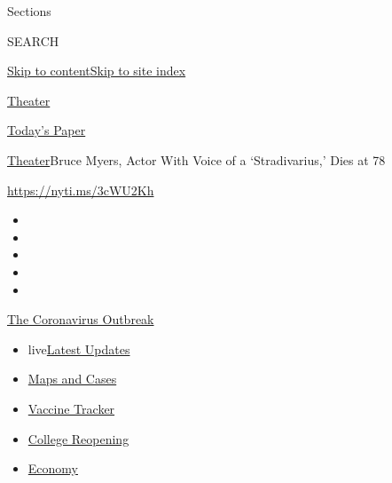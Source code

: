 Sections

SEARCH

\protect\hyperlink{site-content}{Skip to
content}\protect\hyperlink{site-index}{Skip to site index}

\href{https://www.nytimes.com/section/theater}{Theater}

\href{https://myaccount.nytimes.com/auth/login?response_type=cookie\&client_id=vi}{}

\href{https://www.nytimes.com/section/todayspaper}{Today's Paper}

\href{/section/theater}{Theater}\textbar{}Bruce Myers, Actor With Voice
of a `Stradivarius,' Dies at 78

\url{https://nyti.ms/3cWU2Kh}

\begin{itemize}
\item
\item
\item
\item
\item
\end{itemize}

\href{https://www.nytimes.com/news-event/coronavirus?action=click\&pgtype=Article\&state=default\&region=TOP_BANNER\&context=storylines_menu}{The
Coronavirus Outbreak}

\begin{itemize}
\tightlist
\item
  live\href{https://www.nytimes.com/2020/08/03/world/coronavirus-covid-19.html?action=click\&pgtype=Article\&state=default\&region=TOP_BANNER\&context=storylines_menu}{Latest
  Updates}
\item
  \href{https://www.nytimes.com/interactive/2020/us/coronavirus-us-cases.html?action=click\&pgtype=Article\&state=default\&region=TOP_BANNER\&context=storylines_menu}{Maps
  and Cases}
\item
  \href{https://www.nytimes.com/interactive/2020/science/coronavirus-vaccine-tracker.html?action=click\&pgtype=Article\&state=default\&region=TOP_BANNER\&context=storylines_menu}{Vaccine
  Tracker}
\item
  \href{https://www.nytimes.com/2020/08/02/us/covid-college-reopening.html?action=click\&pgtype=Article\&state=default\&region=TOP_BANNER\&context=storylines_menu}{College
  Reopening}
\item
  \href{https://www.nytimes.com/live/2020/08/03/business/stock-market-today-coronavirus?action=click\&pgtype=Article\&state=default\&region=TOP_BANNER\&context=storylines_menu}{Economy}
\end{itemize}

